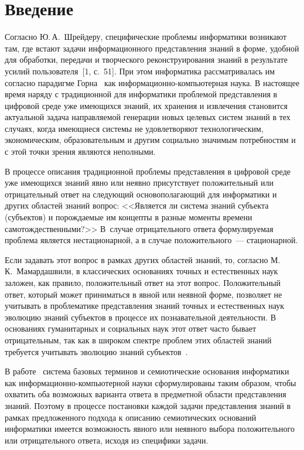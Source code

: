       \begin{multicols}{2}

      \label{st\stat}


\section{Введение}

   Согласно Ю.\,А.~Шрейдеру, специфические проблемы информатики возникают там, где
встают задачи информационного представления знаний в форме, удобной для обработки,
передачи и творческого реконструирования знаний в результате %
усилий пользователя~[1, с.~51]. При этом ин\-фор\-мати\-ка рассматривалась им 
согласно парадигме Горна~\cite{2za, 3za} как информационно-компьютерная наука. 
В настоящее время наряду с традиционной для информатики проблемой представления 
в цифровой среде уже имеющихся знаний, их хранения и извлечения становится 
актуальной задача на\-прав\-ля\-емой генерации новых целевых систем знаний в 
тех случаях, когда имеющиеся системы не удовлетворяют технологическим, 
экономическим, образовательным и другим социально значимым потребностям и с 
этой точки зрения являются неполными. {

}

   В процессе описания традиционной проблемы представления в цифровой среде уже
имеющихся знаний явно или неявно присутствует положительный или отрицательный ответ
на следующий основополагающий для информатики и других областей знаний вопрос:
<<Является ли система знаний субъекта (субъектов) и порождаемые им концепты в разные
моменты времени самотождественными?>> В~случае отрицательного ответа формулируемая
проблема  является нестационарной, а в случае положительного~--- стационарной.

   Если задавать этот вопрос в рамках других областей знаний, то, согласно
М.\,К.~Мамардашвили, в классических основаниях точных и естественных наук заложен, как
правило, положительный ответ на этот вопрос. Положительный ответ, который может
приниматься в явной или неявной форме, позволяет не учитывать в проблематике
пред\-став\-ле\-ния знаний точных и естественных наук эволюцию знаний субъектов в процессе
их познавательной деятельности. В основаниях гуманитарных и социальных наук этот ответ
часто бывает отрицательным, так как в широком спектре проблем этих областей знаний
требуется учитывать эволюцию знаний субъектов~\cite{4za}.

   В работе~\cite{5za} система базовых терминов и семиотические основания информатики
как ин\-фор\-ма\-ционно-компьютерной науки сформулированы таким образом, чтобы охватить
оба возможных варианта ответа в предметной области представления знаний. Поэтому в
процессе постановки каждой задачи представления знаний в рамках предложенного подхода
к описанию семиотических оснований информатики имеется возможность явного или
неявного выбора положительного или отрицательного ответа, исходя из специфики задачи.


\end{multicols}
